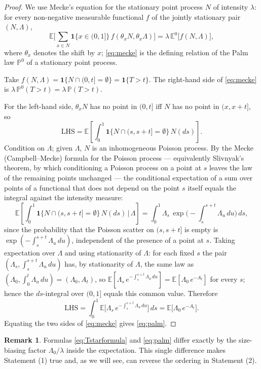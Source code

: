 \documentclass{amsart}
\theoremstyle{plain}
\theoremstyle{definition}
\newtheorem{remark}{Remark}
\newcommand{\E}{\mathbb{E}}
\newcommand{\Prob}{\mathbb{P}}
\newcommand{\Lam}{\Lambda}
\begin{document}
\begin{proof}
We use Mecke's equation for the stationary point process $N$ of intensity $\lambda$:
for every non-negative measurable functional $f$ of the jointly stationary pair
$(N,\Lam)$,
\begin{equation}\label{eq:mecke}
  \E\Big[\sum_{x\in N}\mathbf1\{x\in(0,1]\}\,f(\theta_xN,\theta_x\Lam)\Big]
   =\lambda\,\E^0\big[f(N,\Lam)\big],
\end{equation}
where $\theta_x$ denotes the shift by $x$; \eqref{eq:mecke} is the defining relation
of the Palm law $\Prob^0$ of a stationary point process.

Take $f(N,\Lam)=\mathbf1\{N\cap(0,t]=\emptyset\}=\mathbf1\{T>t\}$. The right-hand side
of \eqref{eq:mecke} is $\lambda\,\Prob^0(T>t)=\lambda\,\Prob(T>t)$.

For the left-hand side, $\theta_xN$ has no point in $(0,t]$ iff $N$ has no point in
$(x,x+t]$, so
\[
  \text{LHS}=\E\!\left[\int_0^1\mathbf1\{N\cap(s,s+t]=\emptyset\}\,N(ds)\right].
\]
Condition on $\Lam$; given $\Lam$, $N$ is an inhomogeneous Poisson process. By the
Mecke (Campbell--Mecke) formula for the Poisson process — equivalently Slivnyak's
theorem, by which conditioning a Poisson process on a point at $s$ leaves the law of
the remaining points unchanged — the conditional expectation of a sum over points of a
functional that does not depend on the point $s$ itself equals the integral against the
intensity measure:
\[
  \E\!\left[\int_0^1\mathbf1\{N\cap(s,s+t]=\emptyset\}\,N(ds)\,\Big|\,\Lam\right]
   =\int_0^1\Lam_s\,\exp\!\Big(-\int_s^{s+t}\Lam_u\,du\Big)\,ds ,
\]
since the probability that the Poisson scatter on $(s,s+t]$ is empty is
$\exp(-\int_s^{s+t}\Lam_u\,du)$, independent of the presence of a point at $s$. Taking
expectation over $\Lam$ and using stationarity of $\Lam$: for each fixed $s$ the
pair $(\Lam_s,\int_s^{s+t}\Lam_u\,du)$ has, by stationarity of $\Lam$, the same law as
$(\Lam_0,\int_0^t\Lam_u\,du)=(\Lam_0,A_t)$, so
$\E[\Lam_s\,e^{-\int_s^{s+t}\Lam_u\,du}]=\E[\Lam_0\,e^{-A_t}]$ for every $s$; hence the
$ds$-integral over $(0,1]$ equals this common value. Therefore
\[
  \text{LHS}=\int_0^1\E\!\Big[\Lam_s\,e^{-\int_s^{s+t}\Lam_u\,du}\Big]\,ds
            =\E\big[\Lam_0\,e^{-A_t}\big].
\]
Equating the two sides of \eqref{eq:mecke} gives \eqref{eq:palm}.
\end{proof}

\begin{remark}
Formulas \eqref{eq:Tstarformula} and \eqref{eq:palm} differ exactly by the
size-biasing factor $\Lam_0/\lambda$ inside the expectation. This single difference
makes Statement (1) true and, as we will see, can reverse the ordering in Statement
(2).
\end{remark}
\end{document}
